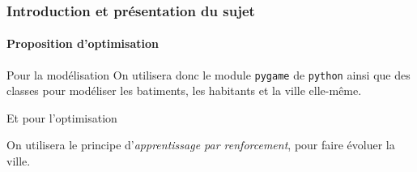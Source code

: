 \begin{frame}
    \frametitle{Introduction et présentation du sujet}
    \framesubtitle{Proposition d'optimisation}
    \begin{block}{Pour la modélisation}
    \pause
    On utilisera donc le module \texttt{pygame} de \texttt{python} ainsi que des classes pour modéliser les batiments, les habitants et la ville elle-même.
    \end{block}
    \pause
    
    \begin{block}{Et pour l'optimisation}
    \pause
    
    On utilisera le principe d'\textit{apprentissage par renforcement}, pour faire évoluer la ville. 
    \end{block}
\end{frame}


